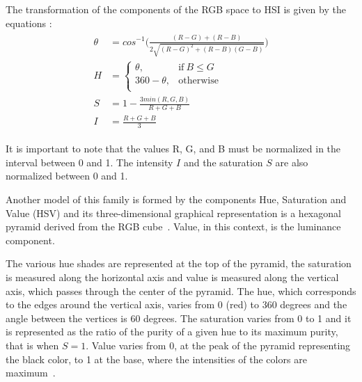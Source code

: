 The transformation of the components of the RGB space to HSI is given by the equations \citep{pedrini:08}:
\begin{align}
\label{eq:rgb_para_hsi}
\begin{split}
  \theta &= cos^{-1} \bigg( \frac{(R - G) + (R - B)}{2 \sqrt{(R - G)^2 + (R - B)(G - B)}} \bigg)
  \\[0.5em]
  H &= \begin{cases}
            \theta,       & \text{if}\ B \leq G\\
            360 - \theta, & \text{otherwise}\\
       \end{cases}
  \\[0.5em]
  S &= 1 - \frac{3 min(R, G, B)}{R + G + B}
  \\[0.5em]
  I &= \frac{R + G + B}{3}
\end{split}
\end{align}

It is important to note that the values R, G, and B must be normalized in the interval between 0 and 1. The intensity $I$ and the saturation $S$ are also normalized between 0 and 1.

Another model of this family is formed by the components Hue, Saturation and Value (HSV) and its three-dimensional graphical representation is a hexagonal pyramid derived from the RGB cube~\citep{pedrini:08}. Value, in this context, is the luminance component.

The various hue shades are represented at the top of the pyramid, the saturation is measured along the horizontal axis and value is measured along the vertical axis, which passes through the center of the pyramid. The hue, which corresponds to the edges around the vertical axis, varies from 0 (red) to 360 degrees and the angle between the vertices is 60 degrees. The saturation varies from 0 to 1 and it is represented as the ratio of the purity of a given hue to its maximum purity, that is when $S = 1$. Value varies from 0, at the peak of the pyramid representing the black color, to 1 at the base, where the intensities of the colors are maximum~\citep{pedrini:08}.

